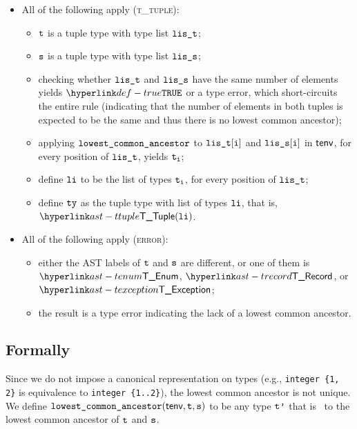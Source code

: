 \begin{itemize}
\begin{itemize}
    \item All of the following apply (\textsc{t\_tuple}):
    \begin{itemize}
      \item $\texttt{t}$ is a tuple type with type list $\texttt{lis\_t}$;
      \item $\texttt{s}$ is a tuple type with type list $\texttt{lis\_s}$;
      \item checking whether $\texttt{lis\_t}$ and $\texttt{lis\_s}$ have the same number of elements yields $\True$
            or a type error, which short-circuits the entire rule (indicating that the number of elements in both tuples is expected
            to be the same and thus there is no lowest common ancestor);
      \item applying $\texttt{lowest\_common\_ancestor}$ to $\texttt{lis\_t}[\texttt{i}]$ and $\texttt{lis\_s}[\texttt{i}]$ in $\textsf{tenv}$, for every position of $\texttt{lis\_t}$,
            yields $\texttt{t}_{\texttt{i}}$\ProseOrTypeError;
      \item define $\texttt{li}$ to be the list of types $\texttt{t}_{\texttt{i}}$, for every position of $\texttt{lis\_t}$;
      \item define $\texttt{ty}$ as the tuple type with list of types $\texttt{li}$, that is, $\TTuple(\vli)$.
    \end{itemize}

    \item All of the following apply (\textsc{error}):
    \begin{itemize}
      \item either the AST labels of $\texttt{t}$ and $\texttt{s}$ are different, or one of them is $\TEnum$, $\TRecord$, or $\TException$;
      \item the result is a type error indicating the lack of a lowest common ancestor.
    \end{itemize}
  \end{itemize}
\end{itemize}



\subsection{Formally}
Since we do not impose a canonical representation on types (e.g., \verb|integer {1, 2}| is equivalence to \verb|integer {1..2}|),
the lowest common ancestor is not unique.
We define $\texttt{lowest\_common\_ancestor}(\textsf{tenv}, \texttt{t}, \texttt{s})$ to be any type $\texttt{t'}$ that is \typeequivalent\ to the lowest common ancestor of $\texttt{t}$ and $\texttt{s}$.

